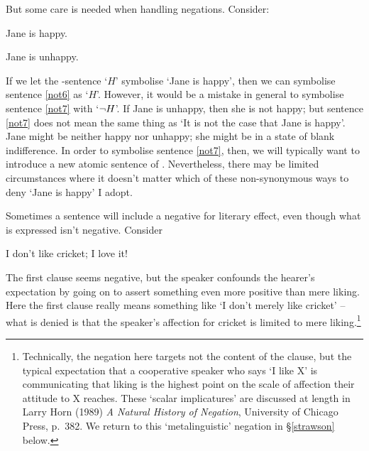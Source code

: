 But some care is needed when handling negations. Consider:
	\begin{earg}
		\item[\ex{not6}] Jane is happy.
		\item[\ex{not7}] Jane is unhappy.
	\end{earg}
If we let the \TFL-sentence `$H$' symbolise  `Jane is happy', then we can symbolise sentence \ref{not6} as `$H$'. However, it would be a mistake in general to symbolise sentence \ref{not7} with `$\neg{H}$'. If Jane is unhappy, then she is not happy; but sentence \ref{not7} does not mean the same thing as `It is not the case that Jane is happy'. Jane might be neither happy nor unhappy; she might be in a state of blank indifference. In order to symbolise sentence \ref{not7}, then, we will typically want to introduce a new atomic sentence of \TFL. Nevertheless, there may be limited circumstances where it doesn't matter which of these non-synonymous ways to deny `Jane is happy' I adopt.

Sometimes a sentence will include a negative for literary effect, even though what is expressed isn't negative. Consider \begin{earg}
	\item[\ex{sc.imp}] I don't like cricket; I love it!
\end{earg} The first clause seems negative, but the speaker confounds the hearer's expectation by going on to assert something even more positive than mere liking. Here the first clause really means something like `I don't merely like cricket' – what is denied is that the speaker's affection for cricket is limited to mere liking.\footnote{Technically, the negation here targets not the content of the clause, but the typical expectation that a cooperative speaker who says `I like X' is communicating that liking is the highest point on the scale of affection their attitude to X reaches. These `scalar implicatures' are discussed at length in Larry Horn (1989) \emph{A Natural History of Negation}, University of Chicago Press, p.\ 382. We return to this `metalinguistic' negation in §\ref{strawson} below.}

